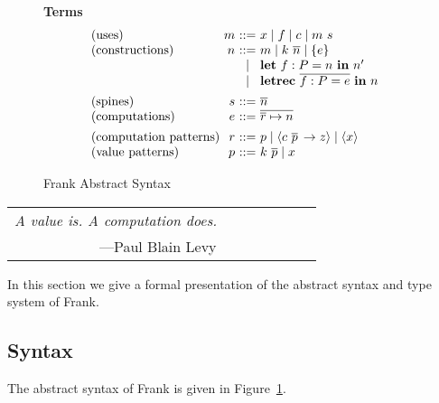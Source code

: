 \documentclass[12pt]{article}
\makeatletter
\newcommand{\fighead}{\textbf}
\newcommand{\many}{\overline}
\newcommand\ba{\begin{array}}
\newcommand\ea{\end{array}}
\newenvironment{syntax}{\[\ba{@{}l@{~}r@{~}c@{~}l@{}}}{\ea\]\ignorespacesafterend}
\newcommand{\key}[1]{\textbf{#1}} %
\newcommand{\handleSymbol}{\rightarrow}
\newcommand{\handle}[2]{{#1} \handleSymbol {#2}}
\newcommand{\thunk}[1]{\{{#1}\}}
\newcommand{\force}[1]{{#1}!}
\newcommand\slab[1]{(\textrm{#1})}
\newcommand{\effin}[1]{\langle {#1} \rangle}
\makeatother
\begin{document}
\begin{figure}
\fighead{Terms}
\begin{syntax}
\slab{uses}               &m       &::=& x \mid f \mid c \mid m~s \\
\slab{constructions}      &n       &::=& m \mid k~\many{n} \mid \thunk{e} \\
                       &       &\mid& \key{let}~f : P = n~\key{in}~n' \\
                       &       &\mid& \key{letrec}~\many{f : P = e}~\key{in}~n \\
[1ex]
\slab{spines}          &s       &::=& \many{n} \\
\slab{computations}     &e       &::=& \many{\many{r} \mapsto n}
\\[1ex]
\slab{computation patterns}&r &::=& p
                               \mid \effin{\handle{c~\many{p}\,}{z}}
                               \mid \effin{x} \\
\slab{value patterns}&p       &::=& k~\many{p} \mid x        \\
\end{syntax}

\caption{Frank Abstract Syntax}
\label{fig:frank-syntax}
\end{figure}

\begin{center}
\begin{tabular}{c}
{\em A value is. A computation does.} $\qquad \qquad \qquad $\\
\hfill---Paul Blain Levy~\cite{Levy2004}
\end{tabular}
\end{center}
%
In this section we give a formal presentation of the abstract syntax
and type system of Frank.

\subsection{Syntax}
%
The abstract syntax of Frank is given in
Figure~\ref{fig:frank-syntax}.
\end{document}

